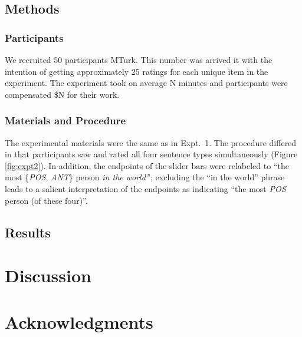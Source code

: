 \documentclass[10pt,letterpaper]{article}
\newcommand{\figref}[1]{Figure \ref{#1}}
\begin{document}
\subsection{Methods}

\subsubsection{Participants}

We recruited 50 participants MTurk.
This number was arrived it with the intention of getting approximately 25 ratings for each unique item in the experiment.
The experiment took on average N minutes and participants were compensated \$N for their work.


\subsubsection{Materials and Procedure}
The experimental materials were the same as in Expt.~1. 
The procedure differed in that participants saw and rated all four sentence types simultaneously (\figref{fig:expt2}). 
In addition, the endpoints of the slider bars were relabeled to ``the most \{\emph{POS}, \emph{ANT}\} person \emph{in the world'}'; excluding the ``in the world'' phrase leads to a salient interpretation of the endpoints as indicating ``the most \emph{POS} person (of these four)''.

\subsection{Results}

\section{Discussion}

\section{Acknowledgments}




\setlength{\bibleftmargin}{.125in}
\setlength{\bibindent}{-\bibleftmargin}


\end{document}
